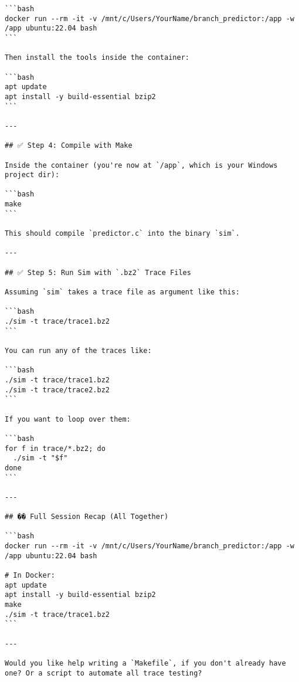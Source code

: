 \documentclass[11pt]{article}
\begin{document}
\begin{verbatim}
```bash
docker run --rm -it -v /mnt/c/Users/YourName/branch_predictor:/app -w /app ubuntu:22.04 bash
```

Then install the tools inside the container:

```bash
apt update
apt install -y build-essential bzip2
```

---

## ✅ Step 4: Compile with Make

Inside the container (you're now at `/app`, which is your Windows project dir):

```bash
make
```

This should compile `predictor.c` into the binary `sim`.

---

## ✅ Step 5: Run Sim with `.bz2` Trace Files

Assuming `sim` takes a trace file as argument like this:

```bash
./sim -t trace/trace1.bz2
```

You can run any of the traces like:

```bash
./sim -t trace/trace1.bz2
./sim -t trace/trace2.bz2
```

If you want to loop over them:

```bash
for f in trace/*.bz2; do
  ./sim -t "$f"
done
```

---

## �� Full Session Recap (All Together)

```bash
docker run --rm -it -v /mnt/c/Users/YourName/branch_predictor:/app -w /app ubuntu:22.04 bash

# In Docker:
apt update
apt install -y build-essential bzip2
make
./sim -t trace/trace1.bz2
```

---

Would you like help writing a `Makefile`, if you don't already have one? Or a script to automate all trace testing?
\end{verbatim}
\end{document}
